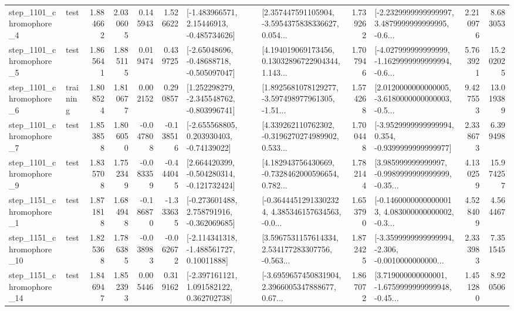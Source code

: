 \begin{tabular}{llrrrrllrlrr}
  step\_1101\_chromophore\_4 &      test &      1.884662 &    2.030605 &      0.145943 &  1.526622 &    [-1.483966571, 2.15446913, -0.485734626] &  [2.357447591105904, -3.5954375838336627, 0.054... &       1.739262 &  [-2.2329999999999997, 3.4879999999999995, -0.6... &            2.210976 &          8.683053 \\
  step\_1101\_chromophore\_5 &      test &      1.865641 &    1.885115 &      0.019474 &  0.439725 &    [-2.65048696, -0.48688718, -0.505097047] &  [4.194019069173456, 0.13032896722904344, 1.143... &       1.707946 &  [-4.027999999999999, -1.1629999999999994, -0.6... &            5.763921 &         15.202025 \\
  step\_1101\_chromophore\_6 &  training &      1.808524 &    1.810677 &      0.002152 &  0.290857 &   [1.252298279, -2.345548762, -0.803996741] &  [1.8925681078129277, -3.597498977961305, -1.51... &       1.574268 &  [2.0120000000000005, -3.6180000000000003, -0.5... &            9.427553 &         13.019389 \\
  step\_1101\_chromophore\_7 &      test &      1.853858 &    1.806050 &     -0.047808 & -0.138516 &    [-2.655568805, 0.203930403, -0.74139022] &  [4.339262110762302, -0.3196270274989902, 0.533... &       1.700448 &  [-3.9529999999999994, 0.354, -0.9399999999999977] &            2.338673 &          6.399498 \\
  step\_1101\_chromophore\_9 &      test &      1.835708 &    1.752349 &     -0.083359 & -0.444045 &   [2.664420399, -0.504280314, -0.121732424] &  [4.182943756430669, -0.7328462000596654, 0.782... &       1.782144 &  [3.985999999999997, -0.9989999999999999, -0.35... &            4.130259 &         15.974257 \\
  step\_1151\_chromophore\_1 &      test &      1.871818 &    1.684948 &     -0.186870 & -1.333635 &   [-0.273601488, 2.758791916, -0.362069685] &  [-0.36444512913302324, 4.385346157634563, -0.0... &       1.653790 &  [-0.14600000000000013, 4.083000000000002, -0.3... &            4.528409 &          4.564467 \\
 step\_1151\_chromophore\_10 &      test &      1.825368 &    1.786385 &     -0.038983 & -0.062672 &    [-2.114341318, -1.488561727, 0.10011888] &  [3.5967531157614334, 2.534177283307756, -0.563... &       1.872425 &  [-3.3599999999999994, -2.306, -0.0010000000000... &            2.333983 &          7.351545 \\
 step\_1151\_chromophore\_14 &      test &      1.846947 &    1.852393 &      0.005446 &  0.319162 &    [-2.397161121, 1.091582122, 0.362702738] &  [-3.6959657450831904, 2.3966005347888677, 0.67... &       1.867072 &  [3.719000000000001, -1.6759999999999948, -0.45... &            1.451280 &          8.920506 \\

\end{tabular}
